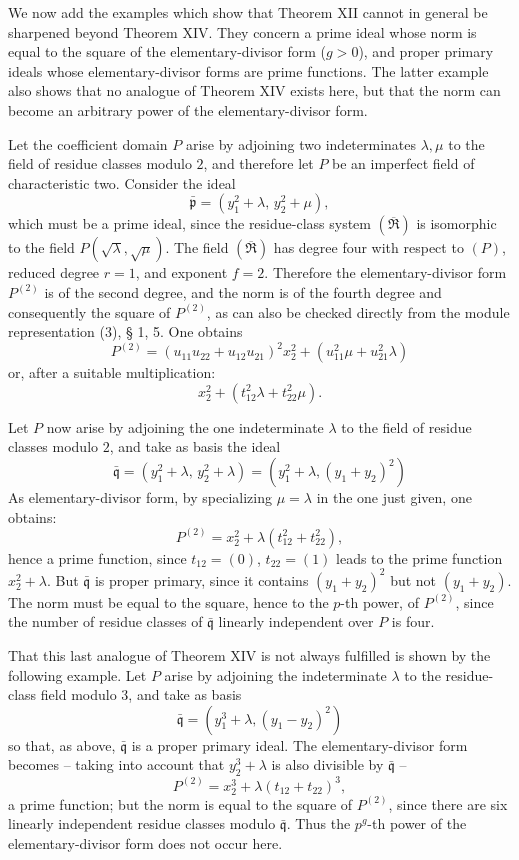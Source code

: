 \documentclass[11pt]{article}
\providecommand{\frakp}{\mathfrak p}
\providecommand{\frakq}{\mathfrak q}
\providecommand{\bR}{\overline{\mathfrak{R}}}
\providecommand{\frakp}{\mathfrak p}
\providecommand{\frakp}{\mathfrak p}
\providecommand{\frakq}{\mathfrak q}
\begin{document}
We now add the examples which show that Theorem XII cannot in general be sharpened beyond Theorem XIV. They concern a prime ideal whose norm is equal to the square of the elementary-divisor form ($g>0$), and proper primary ideals whose elementary-divisor forms are prime functions. The latter example also shows that no analogue of Theorem XIV exists here, but that the norm can become an arbitrary power of the elementary-divisor form.

Let the coefficient domain $P$ arise by adjoining two indeterminates $\lambda,\mu$ to the field of residue classes modulo $2$, and therefore let $P$ be an imperfect field of characteristic two. Consider the ideal
\[
 \bar{\frakp}=(y_1^2+\lambda,\,y_2^2+\mu),
\]
which must be a prime ideal, since the residue-class system $(\bR)$ is isomorphic to the field $P(\sqrt\lambda,\sqrt\mu)$. The field $(\bR)$ has degree four with respect to $(P)$, reduced degree $r=1$, and exponent $f=2$. Therefore the elementary-divisor form $P^{(2)}$ is of the second degree, and the norm is of the fourth degree and consequently the square of $P^{(2)}$, as can also be checked directly from the module representation (3), § 1, 5. One obtains
\[
 P^{(2)}=(u_{11}u_{22}+u_{12}u_{21})^2x_2^2+(u_{11}^2\mu+u_{21}^2\lambda)
\]
or, after a suitable multiplication:
\[
 x_2^2+(t_{12}^2\lambda+t_{22}^2\mu).
\]

Let $P$ now arise by adjoining the one indeterminate $\lambda$ to the field of residue classes modulo $2$, and take as basis the ideal
\[
 \bar{\frakq}=(y_1^2+\lambda,\,y_2^2+\lambda)=(y_1^2+\lambda,(y_1+y_2)^2)
\]
As elementary-divisor form, by specializing $\mu=\lambda$ in the one just given, one obtains:
\[
 P^{(2)}=x_2^2+\lambda(t_{12}^2+t_{22}^2),
\]
hence a prime function, since $t_{12}=(0)$, $t_{22}=(1)$ leads to the prime function $x_2^2+\lambda$. But $\bar{\frakq}$ is proper primary, since it contains $(y_1+y_2)^2$ but not $(y_1+y_2)$. The norm must be equal to the square, hence to the $p$-th power, of $P^{(2)}$, since the number of residue classes of $\bar{\frakq}$ linearly independent over $P$ is four.

That this last analogue of Theorem XIV is not always fulfilled is shown by the following example. Let $P$ arise by adjoining the indeterminate $\lambda$ to the residue-class field modulo $3$, and take as basis
\[
 \bar{\frakq}=(y_1^3+\lambda,(y_1-y_2)^2)
\]
so that, as above, $\bar{\frakq}$ is a proper primary ideal. The elementary-divisor form becomes -- taking into account that $y_2^3+\lambda$ is also divisible by $\bar{\frakq}$ --
\[
 P^{(2)}=x_2^3+\lambda(t_{12}+t_{22})^3,
\]
a prime function; but the norm is equal to the square of $P^{(2)}$, since there are six linearly independent residue classes modulo $\bar{\frakq}$. Thus the $p^g$-th power of the elementary-divisor form does not occur here.
\end{document}
